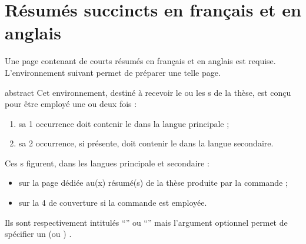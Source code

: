 
\section{Résumés succincts en français et en anglais}\label{sec-abstract}

Une page contenant de courts résumés en français et en anglais est requise.
L'environnement  suivant permet de préparer une telle
page.
%
\begin{docEnvironment}[doclang/environment content=résumé,doc description=\mandatory]{abstract}{}
  Cet environnement, destiné à recevoir le ou les s de la thèse, est
  conçu pour être employé une ou deux fois :
  \begin{enumerate}
  \item sa 1\iere{} occurrence doit contenir le  dans la langue
    principale ;
  \item sa 2\ieme{} occurrence, si présente, doit contenir le  dans la
    langue secondaire.
  \end{enumerate}
  Ces s figurent, dans les langues principale et secondaire :
  \begin{itemize}
  \item sur la page dédiée au(x) résumé(s) de la thèse produite par la commande
     ;
  \item sur la 4\ieme{} de couverture si la commande  est
    employée.
  \end{itemize}
  Ils %
  sont respectivement intitulés \enquote{\abstractname} ou
  \enquote{\abstractname}\selonlangueshort{} mais
  l'argument optionnel permet de spécifier un  (ou )
    \redefexprcle.
\end{docEnvironment}

